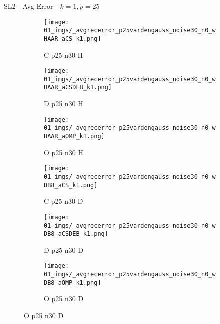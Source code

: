\begin{frame}{SL2 - Avg Error - $k=1,p=25$}{}
\begin{figure}
\vspace{5pt}

\begin{subfigure}{0.13\textwidth}
\texttt{[image: 01\_imgs/\_avgrecerror\_p25vardengauss\_noise30\_n0\_wHAAR\_aCS\_k1.png]}
\caption*{\tiny C p25 n30 H}
\end{subfigure}
\begin{subfigure}{0.13\textwidth}
\texttt{[image: 01\_imgs/\_avgrecerror\_p25vardengauss\_noise30\_n0\_wHAAR\_aCSDEB\_k1.png]}
\caption*{\tiny D p25 n30 H}
\end{subfigure}
\begin{subfigure}{0.13\textwidth}
\texttt{[image: 01\_imgs/\_avgrecerror\_p25vardengauss\_noise30\_n0\_wHAAR\_aOMP\_k1.png]}
\caption*{\tiny O p25 n30 H}
\end{subfigure}
\begin{subfigure}{0.13\textwidth}
\texttt{[image: 01\_imgs/\_avgrecerror\_p25vardengauss\_noise30\_n0\_wDB8\_aCS\_k1.png]}
\caption*{\tiny C p25 n30 D}
\end{subfigure}
\begin{subfigure}{0.13\textwidth}
\texttt{[image: 01\_imgs/\_avgrecerror\_p25vardengauss\_noise30\_n0\_wDB8\_aCSDEB\_k1.png]}
\caption*{\tiny D p25 n30 D}
\end{subfigure}
\begin{subfigure}{0.13\textwidth}
\texttt{[image: 01\_imgs/\_avgrecerror\_p25vardengauss\_noise30\_n0\_wDB8\_aOMP\_k1.png]}
\caption*{\tiny O p25 n30 D}
\end{subfigure}
\end{figure}
\end{frame}

